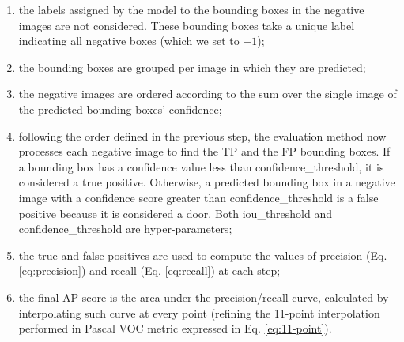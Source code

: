 \begin{enumerate}
	\item the labels assigned by the model to the bounding boxes in the negative images are not considered. These bounding boxes take a unique label indicating all negative boxes (which we set to $ -1 $);
	\item the bounding boxes are grouped per image in which they are predicted;
	\item the negative images are ordered according to the sum over the single image of the predicted bounding boxes' confidence;
	\item following the order defined in the previous step, the evaluation method now processes each negative image to find the TP and the FP bounding boxes. If a bounding box has a confidence value less than \textsf{confidence\_threshold}, it is considered a true positive. Otherwise, a predicted bounding box in a negative image with a confidence score greater than \textsf{confidence\_threshold} is a false positive because it is considered a door. Both \textsf{iou\_threshold} and \textsf{confidence\_threshold} are hyper-parameters;
	\item the true and false positives are used to compute the values of precision (Eq. \ref{eq:precision}) and recall (Eq. \ref{eq:recall}) at each step; 
	\item the final AP score is the area under the precision/recall curve, calculated by interpolating such curve at every point (refining the 11-point interpolation performed in Pascal VOC metric expressed in Eq. \ref{eq:11-point}).
\end{enumerate}






